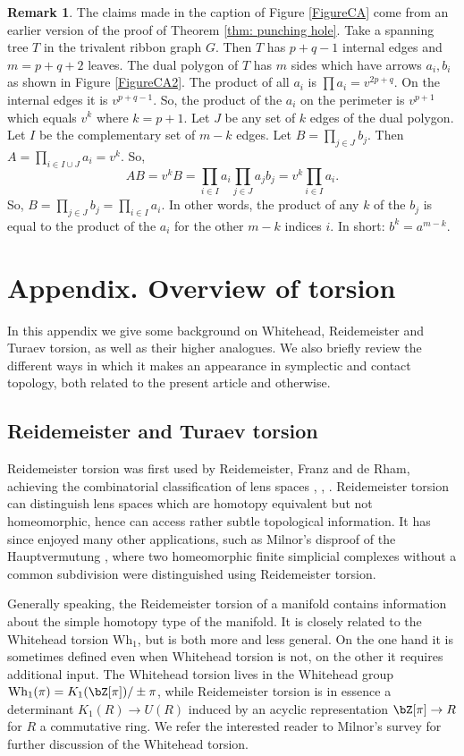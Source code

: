 \documentclass[JEP,XML,SOM,Unicode,NoFloatCountersInSection]{cedram}
\newcommand{\Wh}{\mathrm{Wh}}
\theoremstyle{plain}
\theoremstyle{definition}
\newtheorem{remark}[theorem]{Remark}
\begin{document}
\begin{remark}\label{proof of JKS}
The claims made in the caption of Figure \ref{FigureCA} come from an earlier version of the proof of Theorem \ref{thm: punching hole}. Take a spanning tree $T$ in the trivalent ribbon graph $G$. Then $T$ has $p+q-1$ internal edges and $m=p+q+2$ leaves. The dual polygon of $T$ has $m$ sides which have arrows $a_i,b_i$ as shown in Figure \ref{FigureCA2}. The product of all $a_i$ is $\prod a_i=v^{2p+q}$. On the internal edges it is $v^{p+q-1}$. So, the product of the $a_i$ on the perimeter is $v^{p+1}$ which equals $v^k$ where $k=p+1$. Let $J$ be any set of $k$ edges of the dual polygon. Let $I$ be the complementary set of $m-k$ edges. Let $B=\prod_{j\in J} b_j$. Then $A=\prod_{i\in I\cup J}a_i=v^k$. So,
\[
AB=v^kB=\prod_{i\in I} a_i\prod_{j\in J} a_jb_j=v^{k}\prod_{i\in I}a_i.
\]
So, $B=\prod_{j\in J} b_j=\prod_{i\in I}a_i$. In other words, the product of any $k$ of the $b_j$ is equal to the product of the $a_i$ for the other $m-k$ indices $i$. In short: $b^k=a^{m-k}$.
\end{remark}

\appendix
\section*{Appendix. Overview of torsion}\label{ap:torsion}
In this appendix we give some background on Whitehead, Reidemeister and Turaev torsion, as well as their higher analogues. We also briefly review the different ways in which it makes an appearance in symplectic and contact topology, both related to the present article and otherwise.

\subsection{Reidemeister and Turaev torsion}

Reidemeister torsion was first used by Reidemeister, Franz and de Rham, achieving the combinatorial classification of lens spaces \cite{R35}, \cite{F35}, \cite{dR39}. Reidemeister torsion can distinguish lens spaces which are homotopy equivalent but not homeomorphic, hence can access rather subtle topological information. It has since enjoyed many other applications, such as Milnor's disproof of the Hauptvermutung \cite{M61}, where two homeomorphic finite simplicial complexes without a common subdivision were distinguished using Reidemeister torsion.

Generally speaking, the Reidemeister torsion of a manifold contains information about the simple homotopy type of the manifold. It is closely related to the Whitehead torsion $\Wh_1$, but is both more and less general. On the one hand it is sometimes defined even when Whitehead torsion is not, on the other it requires additional input. The Whitehead torsion lives in the Whitehead group $\Wh_1(\pi)=K_1(\bZ[\pi])/\pm \pi$, while Reidemeister torsion is in essence a determinant $K_1(R) \to U(R)$ induced by an acyclic representation $\bZ[\pi] \to R$ for $R$ a commutative ring. We refer the interested reader to Milnor's survey \cite{M66} for further discussion of the Whitehead torsion.
\end{document}
